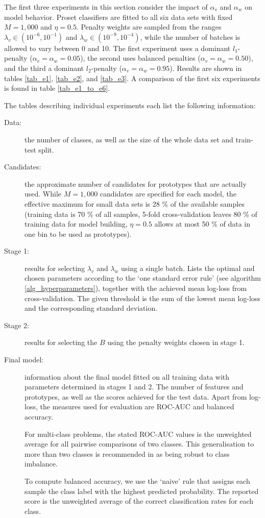 %
The first three experiments in this section consider the impact of $\alpha_v$ and $\alpha_w$ on model behavior.
Proset classifiers are fitted to all six data sets with fixed $M=1,000$ and $\eta=0.5$.
Penalty weights are sampled from the ranges $\lambda_v\in(10^{-6},10^{-1})$ and $\lambda_w\in(10^{-9},10^{-4})$, while the number of batches is allowed to vary between 0 and 10.
The first experiment uses a dominant $l_1$-penalty ($\alpha_v=\alpha_w=0.05$), the second uses balanced penalties ($\alpha_v=\alpha_w=0.50$), and the third a dominant $l_2$-penalty ($\alpha_v=\alpha_w=0.95$).
Results are shown in tables \ref{tab_e1}, \ref{tab_e2}, and \ref{tab_e3}.
A comparison of the first six experiments is found in table \ref{tab_e1_to_e6}.\par
%
The tables describing individual experiments each list the following information:
%
\begin{description}
\item[Data:] the number of classes, as well as the size of the whole data set and train-test split.
%
\item[Candidates:] the approximate number of candidates for prototypes that are actually used.
While $M=1,000$ candidates are specified for each model, the effective maximum for small data sets is 28 \% of the available samples (training data is 70 \% of all samples, 5-fold cross-validation leaves 80 \% of training data for model building, $\eta=0.5$ allows at most 50 \% of data in one bin to be used as prototypes).
%
\item[Stage 1:] results for selecting $\lambda_v$ and $\lambda_w$ using a single batch.
Lists the optimal and chosen parameters according to the `one standard error rule' (see algorithm \ref{alg_hyperparameters}), together with the achieved mean log-loss from cross-validation.
The given threshold is the sum of the lowest mean log-loss and the corresponding standard deviation.
%
\item[Stage 2:] results for selecting the $B$ using the penalty weights chosen in stage 1.
%
\item[Final model:] information about the final model fitted on all training data with parameters determined in stages 1 and 2.
The number of features and prototypes, as well as the scores achieved for the test data.
Apart from log-loss, the measures used for evaluation are ROC-AUC and balanced accuracy.\par
%
For multi-class problems, the stated ROC-AUC values is the unweighted average for all pairwise comparisons of two classes.
This generalisation to more than two classes is recommended in \cite{Hand_01} as being robust to class imbalance.\par
%
To compute balanced accuracy, we use the `naive' rule that assigns each sample the class label with the highest predicted probability.
The reported score is the unweighted average of the correct classification rates for each class.
\end{description}
